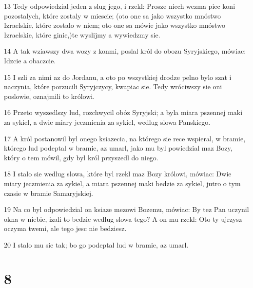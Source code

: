 \par 13 Tedy odpowiedzial jeden z slug jego, i rzekl: Prosze niech wezma piec koni pozostalych, które zostaly w miescie; (oto one sa jako wszystko mnóstwo Izraelskie, które zostalo w niem; oto one sa mówie jako wszystko mnóstwo Izraelskie, które ginie,)te wyslijmy a wywiedzmy sie.
\par 14 A tak wziawszy dwa wozy z konmi, poslal król do obozu Syryjskiego, mówiac: Idzcie a obaczcie.
\par 15 I szli za nimi az do Jordanu, a oto po wszystkiej drodze pelno bylo szat i naczynia, które porzucili Syryjczycy, kwapiac sie. Tedy wróciwszy sie oni poslowie, oznajmili to królowi.
\par 16 Przeto wyszedlszy lud, rozchwycil obóz Syryjski; a byla miara pszennej maki za sykiel, a dwie miary jeczmienia za sykiel, wedlug slowa Panskiego.
\par 17 A król postanowil byl onego ksiazecia, na którego sie rece wspieral, w bramie, którego lud podeptal w bramie, az umarl, jako mu byl powiedzial maz Bozy, który o tem mówil, gdy byl król przyszedl do niego.
\par 18 I stalo sie wedlug slowa, które byl rzekl maz Bozy królowi, mówiac: Dwie miary jeczmienia za sykiel, a miara pszennej maki bedzie za sykiel, jutro o tym czasie w bramie Samaryjskiej.
\par 19 Na co byl odpowiedzial on ksiaze mezowi Bozemu, mówiac: By tez Pan uczynil okna w niebie, izali to bedzie wedlug slowa tego? A on mu rzekl: Oto ty ujrzysz oczyma twemi, ale tego jesc nie bedziesz.
\par 20 I stalo mu sie tak; bo go podeptal lud w bramie, az umarl.

\chapter{8}

